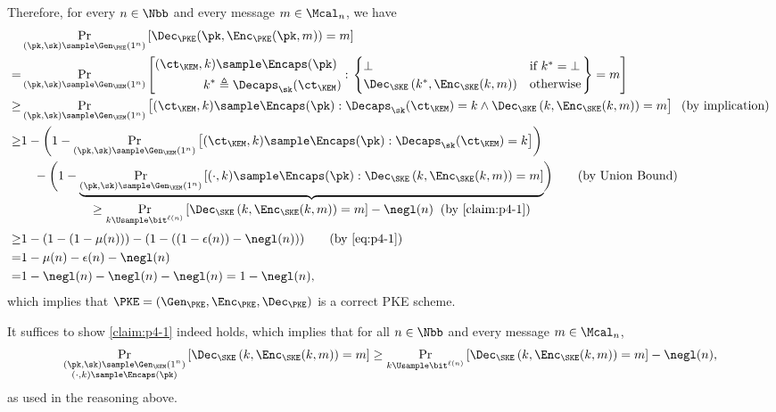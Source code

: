 \begin{answer}
    Therefore, for every $n\in\Nbb$ and every message $m\in\Mcal_n$, we have
    \begin{align*}
        &\Pr_{(\pk, \sk)\sample \Gen_\PKE(1^n)}\left[\Dec_\PKE(\pk, \Enc_\PKE(\pk, m))=m \right]\\
        =&  \Pr_{(\pk, \sk)\sample \Gen_\KEM(1^n)}\left[\begin{aligned}
            (\ct_\KEM, k)&\sample\Encaps(\pk)\\
            k^\ast &\triangleq  \Decaps_\sk(\ct_\KEM)
        \end{aligned}: \left.\begin{cases}
            \bot &\textrm{if } k^\ast=\bot\\
            \Dec_\SKE\left(k^\ast, \Enc_\SKE(k, m)\right) &\textrm{otherwise}
        \end{cases}\right\} = m\right]\\
        \ge& \Pr_{(\pk, \sk)\sample \Gen_\KEM(1^n)}\left[ (\ct_\KEM, k)\sample\Encaps(\pk):  \Decaps_\sk(\ct_\KEM)=k \land \Dec_\SKE\left(k, \Enc_\SKE(k, m)\right)=m \right]
        \;\; (\textrm{by implication})\\
        \ge& 1-\left(1-\Pr_{(\pk, \sk)\sample \Gen_\KEM(1^n)}\left[ (\ct_\KEM, k)\sample\Encaps(\pk):\Decaps_\sk(\ct_\KEM)= k\right]\right)\\
        &\quad - \biggl(1-\underbrace{\Pr_{(\pk, \sk)\sample \Gen_\KEM(1^n)}\left[ (\cdot, k)\sample\Encaps(\pk): \Dec_\SKE\left(k, \Enc_\SKE(k, m)\right)= m \right]}_{\begin{gathered}
            \ge \Pr_{k\Usample\bit^{\ell(n)}}\left[\Dec_\SKE\left(k, \Enc_\SKE(k, m)\right)= m \right]-\negl(n)
            \;\; (\textrm{by \autoref{claim:p4-1}})
        \end{gathered}}\biggr)
        \qquad (\textrm{by Union Bound})\\
        \ge& 1-(1-(1-\mu(n))) -(1- ((1-\epsilon(n))-\negl(n))) 
        \qquad (\textrm{by \eqref{eq:p4-1}})\\
        =& 1-\mu(n) -\epsilon(n) -\negl(n) \\
        =& 1-\negl(n)-\negl(n) -\negl(n)= 1-\negl(n),
    \end{align*}
    which implies that $\PKE=(\Gen_\PKE, \Enc_\PKE, \Dec_\PKE)$ is a correct PKE scheme.

    It suffices to show \autoref{claim:p4-1} indeed holds, which implies that for all $n\in\Nbb$ and every message $m\in\Mcal_n$,
    \[
        \Pr_{\substack{(\pk, \sk)\sample \Gen_\KEM(1^n)\\(\cdot, k)\sample\Encaps(\pk)}}\left[ \Dec_\SKE\left(k, \Enc_\SKE(k, m)\right)= m \right]\ge \Pr_{k\Usample\bit^{\ell(n)}}\left[\Dec_\SKE\left(k, \Enc_\SKE(k, m)\right)= m \right]-\negl(n),
    \]
    as used in the reasoning above.
    

\end{answer}
